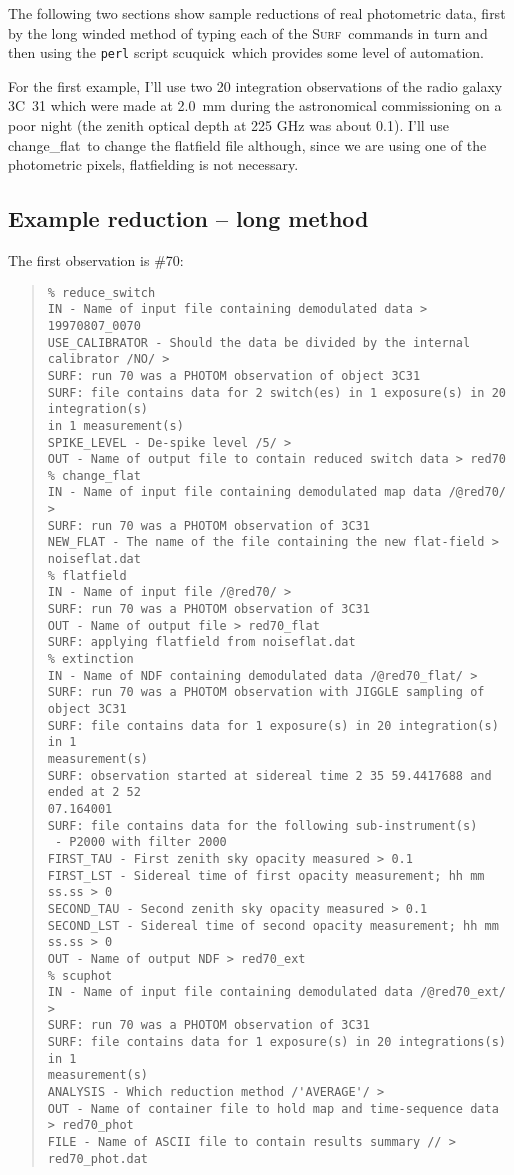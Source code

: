 \documentclass[twoside,11pt,fleqn]{article}
\newenvironment{myquote}{\begin{quote}\begin{small}}{\end{small}\end{quote}}
\newcommand{\surf}{\xref{\textsc{Surf}}{sun216}{}}
\newcommand{\task}[1]{{\sf #1}}
\newcommand{\chgflat}{\xref{\task{change\_flat}}{sun216}{CHANGE_FLAT}}
\newcommand{\scuquick}{\xref{\task{scuquick}}{sun216}{SCUQUICK}}
\newcommand{\xref}[3]{#1}
\newcommand{\xlabel}[1]{}
\begin{document}
The following two sections show sample reductions of real photometric data,
first by the long winded method of typing each of the \surf\ commands in turn
and then using the {\tt perl} \cite{perl} script \scuquick\ which provides
some level of automation.

For the first example, I'll use two 20 integration observations of
the radio galaxy 3C~31 which were made at 2.0~mm during the
astronomical commissioning on a poor night (the zenith optical depth
at 225 GHz was about 0.1).  I'll use \chgflat\ to change the
flatfield file although, since we are using one of the photometric
pixels, flatfielding is not necessary.

\subsection{\xlabel{egred}Example reduction -- long method\label{egred}}

The first observation is \#70:

\begin{myquote}
\begin{verbatim}
% reduce_switch
IN - Name of input file containing demodulated data > 19970807_0070
USE_CALIBRATOR - Should the data be divided by the internal calibrator /NO/ >
SURF: run 70 was a PHOTOM observation of object 3C31
SURF: file contains data for 2 switch(es) in 1 exposure(s) in 20 integration(s)
in 1 measurement(s)
SPIKE_LEVEL - De-spike level /5/ >
OUT - Name of output file to contain reduced switch data > red70
% change_flat
IN - Name of input file containing demodulated map data /@red70/ >
SURF: run 70 was a PHOTOM observation of 3C31
NEW_FLAT - The name of the file containing the new flat-field > noiseflat.dat
% flatfield
IN - Name of input file /@red70/ >
SURF: run 70 was a PHOTOM observation of 3C31
OUT - Name of output file > red70_flat
SURF: applying flatfield from noiseflat.dat
% extinction
IN - Name of NDF containing demodulated data /@red70_flat/ >
SURF: run 70 was a PHOTOM observation with JIGGLE sampling of object 3C31
SURF: file contains data for 1 exposure(s) in 20 integration(s) in 1
measurement(s)
SURF: observation started at sidereal time 2 35 59.4417688 and ended at 2 52
07.164001
SURF: file contains data for the following sub-instrument(s)
 - P2000 with filter 2000
FIRST_TAU - First zenith sky opacity measured > 0.1
FIRST_LST - Sidereal time of first opacity measurement; hh mm ss.ss > 0
SECOND_TAU - Second zenith sky opacity measured > 0.1
SECOND_LST - Sidereal time of second opacity measurement; hh mm ss.ss > 0
OUT - Name of output NDF > red70_ext
% scuphot
IN - Name of input file containing demodulated data /@red70_ext/ >
SURF: run 70 was a PHOTOM observation of 3C31
SURF: file contains data for 1 exposure(s) in 20 integrations(s) in 1
measurement(s)
ANALYSIS - Which reduction method /'AVERAGE'/ >
OUT - Name of container file to hold map and time-sequence data > red70_phot
FILE - Name of ASCII file to contain results summary // > red70_phot.dat
\end{verbatim}
\end{myquote}
\end{document}
